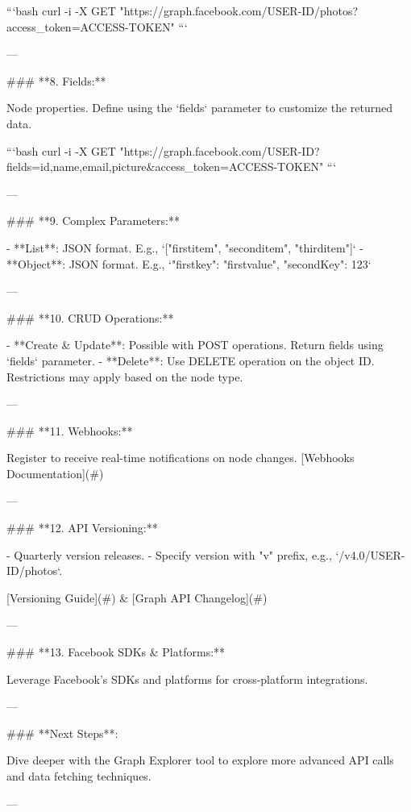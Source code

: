 ```bash
curl -i -X GET "https://graph.facebook.com/USER-ID/photos?access_token=ACCESS-TOKEN"
```

---

### **8. Fields:**

Node properties. Define using the `fields` parameter to customize the returned data.

```bash
curl -i -X GET "https://graph.facebook.com/USER-ID?fields=id,name,email,picture&access_token=ACCESS-TOKEN"
```

---

### **9. Complex Parameters:**

- **List**: JSON format. E.g., `["firstitem", "seconditem", "thirditem"]`
- **Object**: JSON format. E.g., `{"firstkey": "firstvalue", "secondKey": 123}`

---

### **10. CRUD Operations:**

- **Create & Update**: Possible with POST operations. Return fields using `fields` parameter.
- **Delete**: Use DELETE operation on the object ID. Restrictions may apply based on the node type.

---

### **11. Webhooks:**

Register to receive real-time notifications on node changes. [Webhooks Documentation](#)

---

### **12. API Versioning:**

- Quarterly version releases.
- Specify version with "v" prefix, e.g., `/v4.0/USER-ID/photos`.

[Versioning Guide](#) & [Graph API Changelog](#)

---

### **13. Facebook SDKs & Platforms:**

Leverage Facebook's SDKs and platforms for cross-platform integrations.

---

### **Next Steps**:

Dive deeper with the Graph Explorer tool to explore more advanced API calls and data fetching techniques.

---